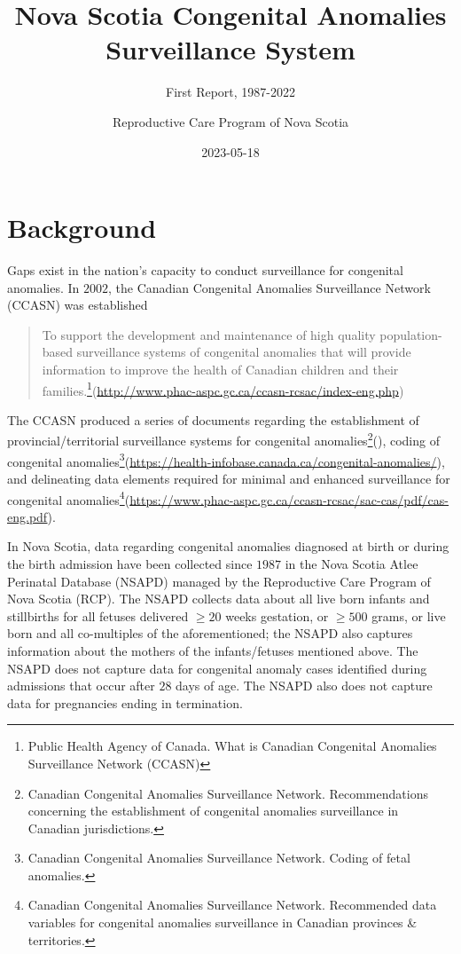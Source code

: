 \documentclass[
]{krantz}
\title{Nova Scotia Congenital Anomalies Surveillance System}
\subtitle{First Report, 1987-2022}
\author{Reproductive Care Program of Nova Scotia}
\date{2023-05-18}
\begin{document}
\pagestyle{empty}

\setcounter{page}{1}
\maketitle
\thispagestyle{empty}
\newpage


{
\hypersetup{linkcolor=}
\setcounter{tocdepth}{3}
\tableofcontents
\newpage
}


\hypertarget{background}{%
\chapter*{Background}\label{background}}


Gaps exist in the nation's capacity to conduct surveillance for congenital anomalies. In \(2002\), the Canadian Congenital Anomalies Surveillance Network (CCASN) was established

\begin{quote}
To support the development and maintenance of high quality population-based surveillance systems of congenital anomalies that will provide information to improve the health of Canadian children and their families.\footnote{Public Health Agency of Canada. What is Canadian Congenital Anomalies Surveillance Network (CCASN)}(\url{http://www.phac-aspc.gc.ca/ccasn-rcsac/index-eng.php})
\end{quote}

The CCASN produced a series of documents regarding the establishment of provincial/territorial surveillance systems for congenital anomalies\footnote{Canadian Congenital Anomalies Surveillance Network. Recommendations concerning the establishment of congenital anomalies surveillance in Canadian jurisdictions.}(), coding of congenital anomalies\footnote{Canadian Congenital Anomalies Surveillance Network. Coding of fetal anomalies.}(\url{https://health-infobase.canada.ca/congenital-anomalies/}), and delineating data elements required for minimal and enhanced surveillance for congenital anomalies\footnote{Canadian Congenital Anomalies Surveillance Network. Recommended data variables for congenital anomalies surveillance in Canadian provinces \& territories.}(\url{https://www.phac-aspc.gc.ca/ccasn-rcsac/sac-cas/pdf/cas-eng.pdf}).

In Nova Scotia, data regarding congenital anomalies diagnosed at birth or during the birth admission have been collected since \(1987\) in the Nova Scotia Atlee Perinatal Database (NSAPD) managed by the Reproductive Care Program of Nova Scotia (RCP). The NSAPD collects data about all live born infants and stillbirths for all fetuses delivered \(\ge 20\) weeks gestation, or \(\ge 500\) grams, or live born and all co-multiples of the aforementioned; the NSAPD also captures information about the mothers of the infants/fetuses mentioned above. The NSAPD does not capture data for congenital anomaly cases identified during admissions that occur after \(28\) days of age. The NSAPD also does not capture data for pregnancies ending in termination.
\end{document}
